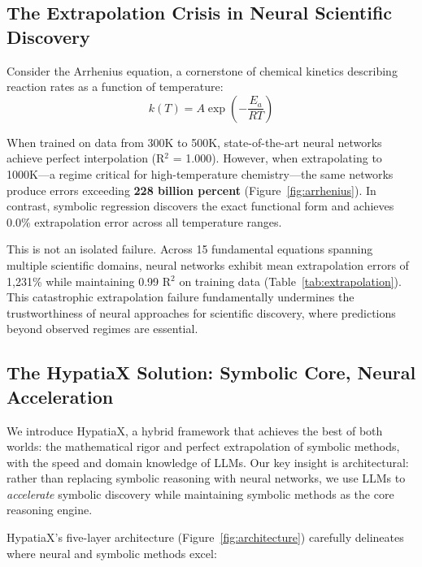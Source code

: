 \documentclass[twoside,11pt]{article}
\begin{document}
\subsection{The Extrapolation Crisis in Neural Scientific Discovery}

Consider the Arrhenius equation, a cornerstone of chemical kinetics describing reaction rates as a function of temperature:
\begin{equation}
k(T) = A \exp\left(-\frac{E_a}{RT}\right)
\label{eq:arrhenius}
\end{equation}

When trained on data from 300K to 500K, state-of-the-art neural networks achieve perfect interpolation (R$^2$ = 1.000). However, when extrapolating to 1000K---a regime critical for high-temperature chemistry---the same networks produce errors exceeding \textbf{228 billion percent} (Figure~\ref{fig:arrhenius}). In contrast, symbolic regression discovers the exact functional form and achieves 0.0\% extrapolation error across all temperature ranges.

This is not an isolated failure. Across 15 fundamental equations spanning multiple scientific domains, neural networks exhibit mean extrapolation errors of 1,231\% while maintaining 0.99 R$^2$ on training data (Table~\ref{tab:extrapolation}). This catastrophic extrapolation failure fundamentally undermines the trustworthiness of neural approaches for scientific discovery, where predictions beyond observed regimes are essential.

\subsection{The HypatiaX Solution: Symbolic Core, Neural Acceleration}

We introduce HypatiaX, a hybrid framework that achieves the best of both worlds: the mathematical rigor and perfect extrapolation of symbolic methods, with the speed and domain knowledge of LLMs. Our key insight is architectural: rather than replacing symbolic reasoning with neural networks, we use LLMs to \emph{accelerate} symbolic discovery while maintaining symbolic methods as the core reasoning engine.

HypatiaX's five-layer architecture (Figure~\ref{fig:architecture}) carefully delineates where neural and symbolic methods excel:
\end{document}
